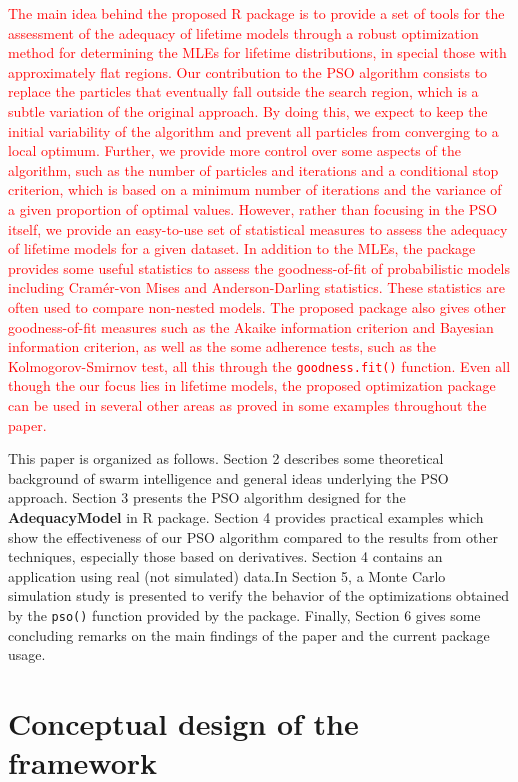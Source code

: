 \documentclass[10pt,letterpaper]{article}
\begin{document}
\textcolor{red}{The main idea behind the proposed \textsc{R} package is to provide a set of tools for the assessment of the adequacy of lifetime models through a robust optimization method for determining the MLEs for lifetime distributions, in special those with approximately flat regions. Our contribution to the PSO algorithm consists to replace the particles that eventually fall outside the search region, which is a subtle variation of the original approach. By doing this, we expect to keep the initial variability of the algorithm and prevent all particles from converging to a local optimum. Further, we provide more control over some aspects of the algorithm, such as the number of particles and iterations and a conditional stop criterion, which is based on a minimum number of iterations and the variance of a given proportion of optimal values. However, rather than focusing in the PSO itself, we provide an easy-to-use set of statistical measures to assess the adequacy of lifetime models for a given dataset. In addition to the MLEs, the package provides some useful statistics to assess the goodness-of-fit of probabilistic models including Cramér-von Mises and Anderson-Darling statistics. These statistics are often used to compare non-nested models.  The proposed package also gives other goodness-of-fit measures such as the Akaike information criterion and Bayesian information criterion, as well as the some adherence tests, such as the Kolmogorov-Smirnov test, all this through the \texttt{goodness.fit()} function. Even all though the our focus lies in lifetime models, the proposed optimization package can be used in several other areas as proved in some examples throughout the paper.}


This paper is organized as follows. Section 2 describes some theoretical background of swarm intelligence
and general ideas underlying the PSO approach. Section 3 presents the PSO algorithm designed for the \textbf{AdequacyModel}
in \textsc{R} package. Section 4 provides practical examples which show the effectiveness of our PSO algorithm compared to the results
from other techniques, especially those based on derivatives. Section 4 contains an application using real (not simulated) data.In Section 5, a Monte Carlo simulation study is presented to verify the behavior of the optimizations obtained by the \texttt{pso()} function provided by the package. Finally, Section 6 gives some concluding remarks on the main findings of the paper and the current package usage.


\section{Conceptual design of the framework} \label{pso}
\end{document}
